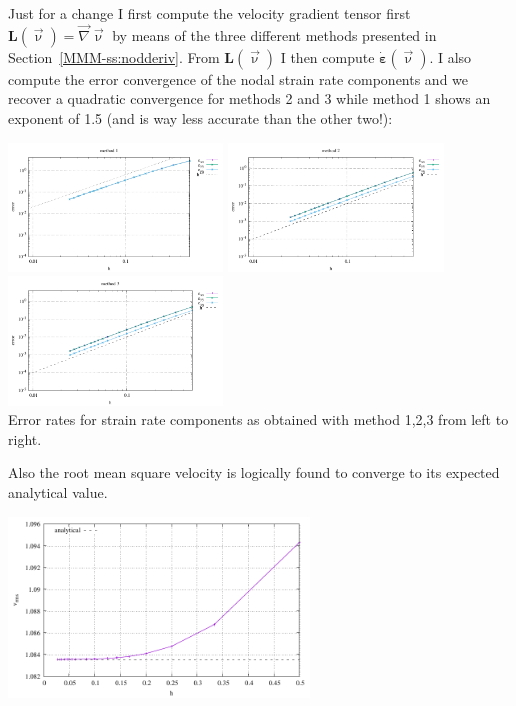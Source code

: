 Just for a change I first compute the velocity gradient tensor 
first ${\bm L}(\vec\upnu)=\vec\nabla\vec\upnu$ by means of 
the three different methods presented in Section~\ref{MMM-ss:nodderiv}.
From ${\bm L}(\vec\upnu)$ I then compute $\dot{\bm \varepsilon}(\vec\upnu)$. 
I also compute the error convergence of the nodal strain rate components 
and we recover a quadratic convergence for methods 2 and 3 while method 1 
shows an exponent of 1.5 (and is way less accurate than the other two!):

\begin{center}
\includegraphics[width=5.7cm]{python_codes/fieldstone_21/RESULTS/errors_sr1.pdf}
\includegraphics[width=5.7cm]{python_codes/fieldstone_21/RESULTS/errors_sr2.pdf}
\includegraphics[width=5.7cm]{python_codes/fieldstone_21/RESULTS/errors_sr3.pdf}\\
{\captionfont Error rates for strain rate components 
as obtained with method 1,2,3 from left to right.}
\end{center}

Also the root mean square velocity is logically found to converge to its 
expected analytical value.

\begin{center}
\includegraphics[width=8cm]{python_codes/fieldstone_21/RESULTS/vrms.pdf}
\end{center}

